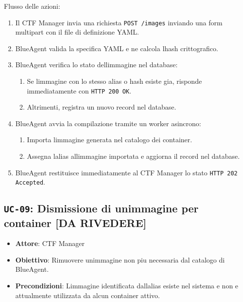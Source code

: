 Flusso delle azioni:

\begin{enumerate}
\def\labelenumi{\arabic{enumi}.}
\tightlist
\item
  Il CTF Manager invia una richiesta
  \passthrough{\lstinline!POST /images!} inviando una form multipart con
  il file di definizione YAML.
\item
  BlueAgent valida la specifica YAML e ne calcola l\textquotesingle hash
  crittografico.
\item
  BlueAgent verifica lo stato dell\textquotesingle immagine nel
  database:

  \begin{enumerate}
  \def\labelenumii{\arabic{enumii}.}
  \tightlist
  \item
    Se l\textquotesingle immagine con lo stesso alias o hash esiste gia,
    risponde immediatamente con \passthrough{\lstinline!HTTP 200 OK!}.
  \item
    Altrimenti, registra un nuovo record nel database.
  \end{enumerate}
\item
  BlueAgent avvia la compilazione tramite un worker asincrono:

  \begin{enumerate}
  \def\labelenumii{\arabic{enumii}.}
  \tightlist
  \item
    Importa l\textquotesingle immagine generata nel catalogo dei
    container.
  \item
    Assegna l\textquotesingle alias all\textquotesingle immagine
    importata e aggiorna il record nel database.
  \end{enumerate}
\item
  BlueAgent restituisce immediatamente al CTF Manager lo stato
  \passthrough{\lstinline!HTTP 202 Accepted!}.
\end{enumerate}

\subsection{\texorpdfstring{\texttt{UC-09}: Dismissione di
un\textquotesingle immagine per container {[}DA
RIVEDERE{]}}{UC-09: Dismissione di un\textquotesingle immagine per container {[}DA RIVEDERE{]}}}\label{uc-09-dismissione-di-unimmagine-per-container-da-rivedere}

\begin{itemize}
\tightlist
\item
  \textbf{Attore}: CTF Manager
\item
  \textbf{Obiettivo}: Rimuovere un\textquotesingle immagine non piu
  necessaria dal catalogo di BlueAgent.
\item
  \textbf{Precondizioni}: L\textquotesingle immagine identificata
  dall\textquotesingle alias esiste nel sistema e non
  e\textquotesingle{} attualmente utilizzata da alcun container attivo.
\end{itemize}

